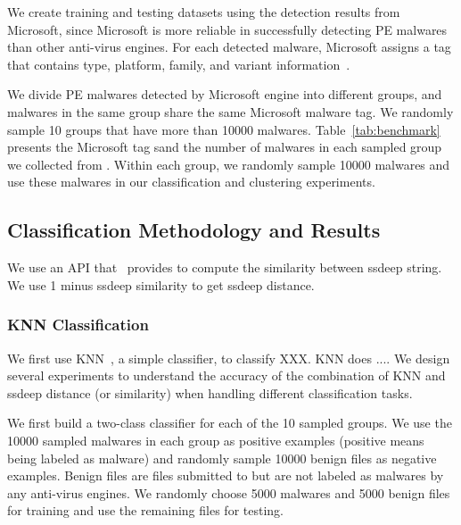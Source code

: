 We create training and testing
datasets using the detection results from Microsoft,
since Microsoft is more reliable in successfully detecting PE malwares~\cite{SongAPsys2016} than other anti-virus engines.
For each detected malware, 
Microsoft assigns a tag that contains type, platform, family, 
and variant information~\cite{microsoft}. 

We divide PE malwares detected by Microsoft engine into different groups, 
and malwares in the same group share the same Microsoft malware tag. 
We randomly sample 10 groups that have more than 10000 malwares.  
Table~\ref{tab:benchmark} presents the Microsoft tag sand the number of malwares in each sampled group we collected from \vt{}. 
Within each group, we randomly sample 10000 malwares and use these malwares in our classification and clustering experiments. 

\subsection{Classification Methodology and Results}
We use an API that \vt\ provides to compute the similarity between ssdeep string. 
We use 1 minus ssdeep similarity to get ssdeep distance.  

\subsubsection{KNN Classification}

We first use KNN~\cite{knn}, a simple classifier, to classify XXX.
KNN does ....
We design several experiments to understand the accuracy of 
the combination of KNN and ssdeep 
distance (or similarity) when handling different classification tasks. 

We first build a two-class classifier for each of the 10 sampled groups. 
We use the 10000 sampled malwares in each group as positive examples (positive means being labeled as malware)
and randomly sample 10000 benign files as negative examples. 
Benign files are files submitted to \vt{} but are not labeled as malwares by any anti-virus engines. 
We randomly choose 5000 malwares and 5000 benign files for training and use the remaining files for testing.


